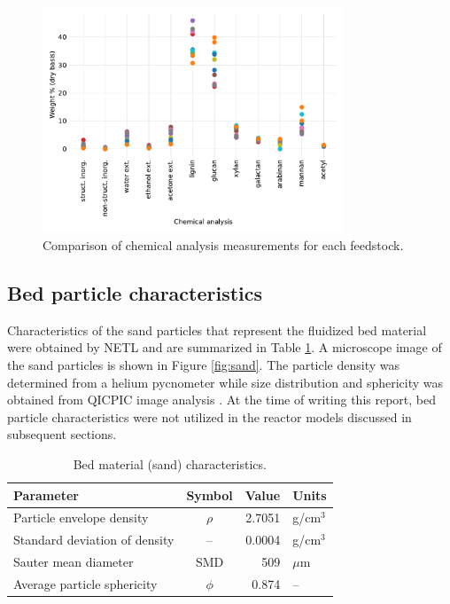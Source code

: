 \begin{figure}[H]
    \centering
    \includegraphics[width=0.8\textwidth]{figures/chem-analysis.pdf}
    \caption{Comparison of chemical analysis measurements for each feedstock.}
    \label{fig:chem-analysis}
\end{figure}

\subsection{Bed particle characteristics}

Characteristics of the sand particles that represent the fluidized bed material were obtained by NETL and are summarized in Table \ref{tab:sand}. A microscope image of the sand particles is shown in Figure \ref{fig:sand}. The particle density was determined from a helium pycnometer while size distribution and sphericity was obtained from QICPIC image analysis \cite{Netl-2021}. At the time of writing this report, bed particle characteristics were not utilized in the reactor models discussed in subsequent sections.

\begin{table}[H]
    \caption{Bed material (sand) characteristics.}
    \label{tab:sand}
    \centering
    \begin{tabular}{lcrl}
        \toprule
        Parameter & Symbol & Value & Units \\
        \midrule
        Particle envelope density     & $\rho$ & 2.7051 & g/cm$^3$ \\
        Standard deviation of density & --     & 0.0004 & g/cm$^3$ \\
        Sauter mean diameter          & SMD    & 509    & $\mu$m \\
        Average particle sphericity   & $\phi$ & 0.874  & -- \\
        \bottomrule
    \end{tabular}
\end{table}


